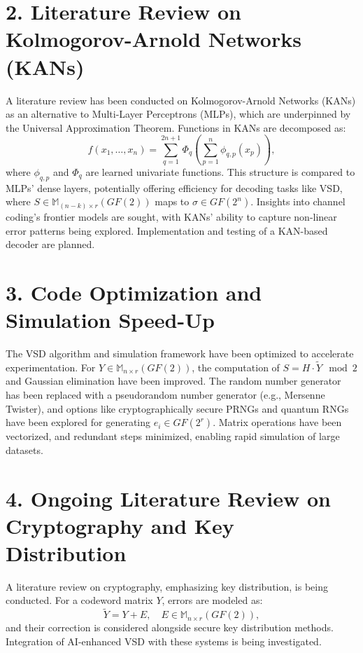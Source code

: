 \documentclass[a4paper,12pt]{article}
\begin{document}
\section*{2. Literature Review on Kolmogorov-Arnold Networks (KANs)}
A literature review has been conducted on Kolmogorov-Arnold Networks (KANs) as an alternative to Multi-Layer Perceptrons (MLPs), which are underpinned by the Universal Approximation Theorem. Functions in KANs are decomposed as:
\[
f(x_1, \dots, x_n) = \sum_{q=1}^{2n+1} \Phi_q \left( \sum_{p=1}^n \phi_{q,p}(x_p) \right),
\]
where \(\phi_{q,p}\) and \(\Phi_q\) are learned univariate functions. This structure is compared to MLPs’ dense layers, potentially offering efficiency for decoding tasks like VSD, where \(S \in \mathbb{M}_{(n-k) \times r}(GF(2))\) maps to \(\sigma \in GF(2^n)\). Insights into channel coding’s frontier models are sought, with KANs’ ability to capture non-linear error patterns being explored. Implementation and testing of a KAN-based decoder are planned.

\section*{3. Code Optimization and Simulation Speed-Up}
The VSD algorithm and simulation framework have been optimized to accelerate experimentation. For \(Y \in \mathbb{M}_{n \times r}(GF(2))\), the computation of \(S = H \cdot \tilde{Y} \mod 2\) and Gaussian elimination have been improved. The random number generator has been replaced with a pseudorandom number generator (e.g., Mersenne Twister), and options like cryptographically secure PRNGs and quantum RNGs have been explored for generating \(e_i \in GF(2^r)\). Matrix operations have been vectorized, and redundant steps minimized, enabling rapid simulation of large datasets.

\section*{4. Ongoing Literature Review on Cryptography and Key Distribution}
A literature review on cryptography, emphasizing key distribution, is being conducted. For a codeword matrix \(Y\), errors are modeled as:
\[
\tilde{Y} = Y + E, \quad E \in \mathbb{M}_{n \times r}(GF(2)),
\]
and their correction is considered alongside secure key distribution methods. Integration of AI-enhanced VSD with these systems is being investigated.
\end{document}
